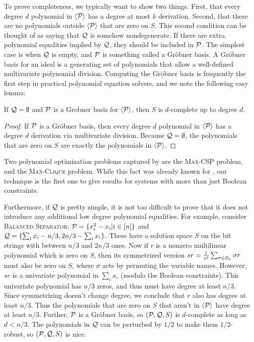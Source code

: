 To prove completeness, we typically want to show two things. First, that every degree $d$ polynomial in $\langle \mathcal P\rangle$ has a degree at most $k$ derivation. Second, that there are no polynomials outside $\langle \mathcal P\rangle$ that are zero on $S$. This second condition can be thought of as saying that $\mathcal Q$ is somehow nondegenerate. If there are extra polynomial equalities implied by $\mathcal Q$, they should be included in $\mathcal P$. The simplest case is when $\mathcal Q$ is empty, and $\mathcal P$ is something called a Gr\"obner basis. A Gr\"obner basis for an ideal is a generating set of polynomials that allow a well-defined multivariate polynomial division. Computing the Gr\"obner basis is frequently the first step in practical polynomial equation solvers, and we note the following easy lemma:
\begin{lemma}\label{lem:grobner}
If $\mathcal Q = \emptyset$ and $\mathcal P$ is a Grobner basis for $\langle \mathcal P\rangle$, then $S$ is $d$-complete up to degree $d$. 
\end{lemma}
\begin{proof}
If $\mathcal P$ is a Gr\"obner basis, then every degree $d$ polynomial in $\langle \mathcal P\rangle$ has a degree $d$ derivation via multivariate division. Because $\mathcal Q = \emptyset$, the polynomials that are zero on $S$ are exactly the polynomials in $\langle \mathcal P\rangle$. 
\end{proof}
Two polynomial optimization problems captured by  are the \textsc{Max-CSP} problem, and the \textsc{Max-Clique} problem. While this fact was already known for , our technique is the first one to give results for systems with more than just Boolean constraints.

Furthermore, if $\mathcal Q$ is pretty simple, it is not too difficult to prove that it does not introduce any additional low degree polynomial equalities. For example, consider \textsc{Balanced Separator}: $\mathcal P = \{x_i^2-x_i | i \in [n]\}$ and $\mathcal Q = \{\sum_i x_i - n/3, 2n/3 - \sum_i x_i\}$. These have a solution space $S$ on the bit strings with between $n/3$ and $2n/3$ ones. Now if $r$ is a nonzero multilinear polynomial which is zero on $S$, then its symmetrized version $sr = \frac{1}{n!}\sum_{\sigma \in \mathcal S_n} \sigma r$ must also be zero on $S$, where $\sigma$ acts by permuting the variable names. However, $sr$ is a univariate polynomial in $\sum_i x_i$ (modulo the Boolean constraints). This univariate polynomial has $n/3$ zeros, and thus must have degree at least $n/3$. Since symmetrizing doesn't change degree, we conclude that $r$ also has degree at least $n/3$. Thus the polynomials that are zero on $S$ that aren't in $\langle \mathcal P\rangle$ have degree at least $n/3$. Further, $\mathcal P$ is a Gr\"obner basis, so $(\mathcal P, \mathcal Q, S)$ is $d$-complete as long as $d < n/3$. The polynomials in $\mathcal Q$ can be perturbed by $1/2$ to make them $1/2$-robust, so $(\mathcal P, \mathcal Q, S)$ is nice. 

